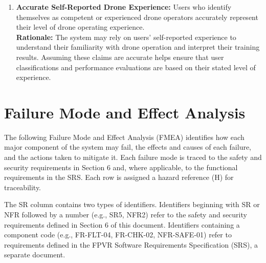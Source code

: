 \documentclass{article}
\begin{document}
\begin{enumerate}
    \item \textbf{Accurate Self-Reported Drone Experience:} Users who identify themselves as competent or experienced drone operators accurately represent their level of drone operating experience.\\
    \textbf{Rationale:} The system may rely on users' self-reported experience to understand their familiarity with drone operation and interpret their training results. Assuming these claims are accurate helps ensure that user classifications and performance evaluations are based on their stated level of experience.

\end{enumerate}

\section{Failure Mode and Effect Analysis}\label{sec:fmea}

The following Failure Mode and Effect Analysis (FMEA) identifies how each major
component of the system may fail, the effects and causes of each failure, and
the actions taken to mitigate it. Each failure mode is traced to the safety and
security requirements in Section 6 and, where applicable, to the functional
requirements in the SRS. Each row is assigned a hazard reference (H) for
traceability.

The SR column contains two types of identifiers. Identifiers beginning with SR
or NFR followed by a number (e.g., SR5, NFR2) refer to the safety and security
requirements defined in Section 6 of this document. Identifiers containing a
component code (e.g., FR-FLT-04, FR-CHK-02, NFR-SAFE-01) refer to requirements
defined in the FPVR Software Requirements Specification (SRS), a separate
document.
\end{document}
